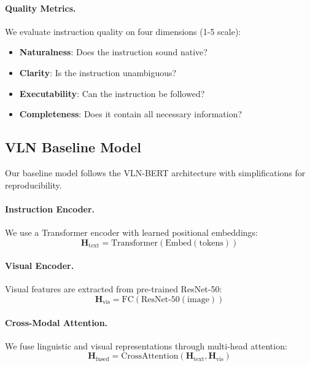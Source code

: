 \documentclass[11pt,a4paper]{article}
\begin{document}
\paragraph{Quality Metrics.} We evaluate instruction quality on four dimensions (1-5 scale):
\begin{itemize}
    \item \textbf{Naturalness}: Does the instruction sound native?
    \item \textbf{Clarity}: Is the instruction unambiguous?
    \item \textbf{Executability}: Can the instruction be followed?
    \item \textbf{Completeness}: Does it contain all necessary information?
\end{itemize}

\subsection{VLN Baseline Model}

Our baseline model follows the VLN-BERT architecture with simplifications for reproducibility.

\paragraph{Instruction Encoder.} We use a Transformer encoder with learned positional embeddings:
\begin{equation}
\mathbf{H}_{\text{text}} = \text{Transformer}(\text{Embed}(\text{tokens}))
\end{equation}

\paragraph{Visual Encoder.} Visual features are extracted from pre-trained ResNet-50:
\begin{equation}
\mathbf{H}_{\text{vis}} = \text{FC}(\text{ResNet-50}(\text{image}))
\end{equation}

\paragraph{Cross-Modal Attention.} We fuse linguistic and visual representations through multi-head attention:
\begin{equation}
\mathbf{H}_{\text{fused}} = \text{CrossAttention}(\mathbf{H}_{\text{text}}, \mathbf{H}_{\text{vis}})
\end{equation}
\end{document}
